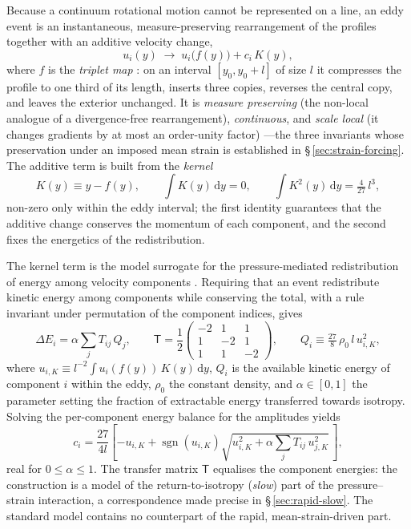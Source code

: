 \documentclass[lineno]{JFM-FLM_Au}
\begin{document}
Because a continuum rotational motion cannot be represented on a line, an
eddy event is an instantaneous, measure-preserving rearrangement of the
profiles together with an additive velocity change,
\begin{equation}
  u_i(y)\;\longrightarrow\;u_i\!\big(f(y)\big)+c_i\,K(y),
  \label{eq:event}
\end{equation}
where $f$ is the \emph{triplet map}
\citep{Kerstein1991,Kerstein1999}: on an interval $[y_0,y_0+l]$ of size
$l$ it compresses the profile to one third of its length, inserts three
copies, reverses the central copy, and leaves the exterior unchanged.
It is \emph{measure preserving} (the non-local analogue of a
divergence-free rearrangement), \emph{continuous}, and \emph{scale
local} (it changes gradients by at most an order-unity factor)
\citep{Kerstein2001}---the
three invariants whose preservation under an imposed mean strain is
established in \S\,\ref{sec:strain-forcing}. The additive term is built
from the \emph{kernel}
\begin{equation}
  K(y)\equiv y-f(y),
  \qquad
  \int K(y)\,\mathrm{d}y = 0,
  \qquad
  \int K^2(y)\,\mathrm{d}y = \tfrac{4}{27}\,l^{3},
  \label{eq:kernel-identities}
\end{equation}
non-zero only within the eddy interval; the first identity guarantees
that the additive change conserves the momentum of each component, and
the second fixes the energetics of the redistribution.

The kernel term is the model surrogate for the pressure-mediated
redistribution of energy among velocity components
\citep{WunschKerstein2001,Kerstein2001}. Requiring that an event
redistribute kinetic energy among components while conserving the total,
with a rule invariant under permutation of the component indices, gives
\begin{equation}
  \Delta E_i = \alpha\sum_j T_{ij}\,Q_j,
  \qquad
  \mathsf{T}=\frac{1}{2}
  \begin{pmatrix}
    -2 & 1 & 1\\ 1 & -2 & 1\\ 1 & 1 & -2
  \end{pmatrix},
  \qquad
  Q_i\equiv\tfrac{27}{8}\,\rho_0\, l\, u_{i,K}^2,
  \label{eq:redistribution}
\end{equation}
where $u_{i,K}\equiv l^{-2}\!\int u_i(f(y))\,K(y)\,\mathrm{d}y$, $Q_i$ is
the available kinetic energy of component $i$ within the eddy, $\rho_0$
the constant density, and $\alpha\in[0,1]$ the parameter setting the
fraction of extractable energy transferred towards isotropy. Solving the
per-component energy balance for the amplitudes yields
\begin{equation}
  c_i = \frac{27}{4l}\left[-u_{i,K}
        +\operatorname{sgn}(u_{i,K})
        \sqrt{u_{i,K}^2+\alpha\sum_j T_{ij}\,u_{j,K}^2}\,\right],
  \label{eq:ci}
\end{equation}
real for $0\le\alpha\le1$. The transfer matrix $\mathsf{T}$ equalises the
component energies: the construction is a model of the
return-to-isotropy (\emph{slow}) part of the pressure--strain
interaction, a correspondence made precise in \S\,\ref{sec:rapid-slow}.
The standard model contains no counterpart of the rapid,
mean-strain-driven part.
\end{document}
